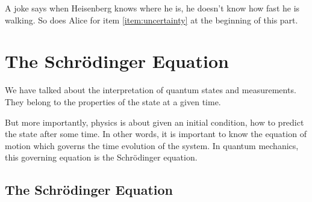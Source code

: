A joke says when Heisenberg knows where he is, he doesn't know how fast he is walking. So does Alice for item \ref{item:uncertainty} at the beginning of this part.


\section{The Schr{\"o}dinger Equation} \label{sec:schro-all}
We have talked about the interpretation of quantum states and measurements. They belong to the properties of the state at a given time.

But more importantly, physics is about given an initial condition, how to predict the state after some time. In other words, it is important to know the equation of motion which governs the time evolution of the system. In quantum mechanics, this governing equation is the Schr{\"o}dinger equation.

\needspace{0.2\textheight}
\subsection{The Schr{\"o}dinger Equation} \label{sec:Schrod}

